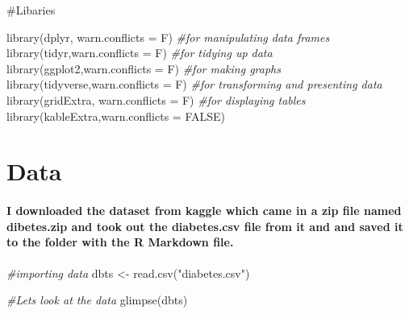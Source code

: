 \documentclass[
]{article}
\newenvironment{Shaded}{\begin{snugshade}}{\end{snugshade}}
\newcommand{\AttributeTok}[1]{\textcolor[rgb]{0.77,0.63,0.00}{#1}}
\newcommand{\CommentTok}[1]{\textcolor[rgb]{0.56,0.35,0.01}{\textit{#1}}}
\newcommand{\ConstantTok}[1]{\textcolor[rgb]{0.00,0.00,0.00}{#1}}
\newcommand{\FunctionTok}[1]{\textcolor[rgb]{0.00,0.00,0.00}{#1}}
\newcommand{\NormalTok}[1]{#1}
\newcommand{\OtherTok}[1]{\textcolor[rgb]{0.56,0.35,0.01}{#1}}
\newcommand{\StringTok}[1]{\textcolor[rgb]{0.31,0.60,0.02}{#1}}
\begin{document}
\#Libaries

\begin{Shaded}
\begin{Highlighting}[]
\FunctionTok{library}\NormalTok{(}\StringTok{\textquotesingle{}dplyr\textquotesingle{}}\NormalTok{, }\AttributeTok{warn.conflicts =}\NormalTok{ F) }\CommentTok{\#for manipulating data frames}
\FunctionTok{library}\NormalTok{(}\StringTok{\textquotesingle{}tidyr\textquotesingle{}}\NormalTok{,}\AttributeTok{warn.conflicts =}\NormalTok{ F)  }\CommentTok{\#for tidying up data}
\FunctionTok{library}\NormalTok{(}\StringTok{\textquotesingle{}ggplot2\textquotesingle{}}\NormalTok{,}\AttributeTok{warn.conflicts =}\NormalTok{ F) }\CommentTok{\#for making graphs }
\FunctionTok{library}\NormalTok{(}\StringTok{\textquotesingle{}tidyverse\textquotesingle{}}\NormalTok{,}\AttributeTok{warn.conflicts =}\NormalTok{ F) }\CommentTok{\#for transforming and presenting data}
\FunctionTok{library}\NormalTok{(}\StringTok{\textquotesingle{}gridExtra\textquotesingle{}}\NormalTok{, }\AttributeTok{warn.conflicts =}\NormalTok{ F) }\CommentTok{\#for displaying tables}
\FunctionTok{library}\NormalTok{(}\StringTok{\textquotesingle{}kableExtra\textquotesingle{}}\NormalTok{,}\AttributeTok{warn.conflicts =} \ConstantTok{FALSE}\NormalTok{)}
\end{Highlighting}
\end{Shaded}

\hypertarget{data}{%
\section{Data}\label{data}}

\hypertarget{i-downloaded-the-dataset-from-kaggle-which-came-in-a-zip-file-named-dibetes.zip-and-took-out-the-diabetes.csv-file-from-it-and-and-saved-it-to-the-folder-with-the-r-markdown-file.}{%
\paragraph{I downloaded the dataset from kaggle which came in a zip file
named dibetes.zip and took out the diabetes.csv file from it and and
saved it to the folder with the R Markdown
file.}\label{i-downloaded-the-dataset-from-kaggle-which-came-in-a-zip-file-named-dibetes.zip-and-took-out-the-diabetes.csv-file-from-it-and-and-saved-it-to-the-folder-with-the-r-markdown-file.}}

\begin{Shaded}
\begin{Highlighting}[]
\CommentTok{\#importing data}
\NormalTok{dbts }\OtherTok{\textless{}{-}} \FunctionTok{read.csv}\NormalTok{(}\StringTok{"diabetes.csv"}\NormalTok{)}

\CommentTok{\#Let\textquotesingle{}s look at the data}
\FunctionTok{glimpse}\NormalTok{(dbts)}
\end{Highlighting}
\end{Shaded}
\end{document}
